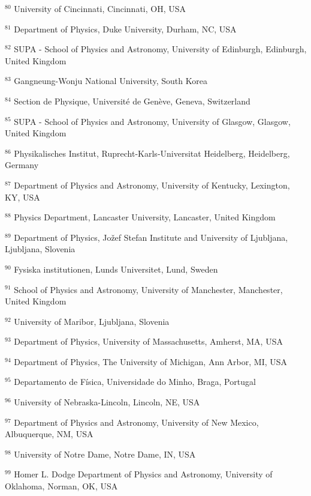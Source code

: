 \par {\footnotesize $^{80}$ University of Cincinnati, Cincinnati, OH, USA}
\par {\footnotesize $^{81}$ Department of Physics, Duke University, Durham, NC, USA}
\par {\footnotesize $^{82}$ SUPA - School of Physics and Astronomy, University of Edinburgh, Edinburgh, United Kingdom}
\par {\footnotesize $^{83}$ Gangneung-Wonju National University, South Korea}
\par {\footnotesize $^{84}$ Section de Physique, Université de Genève, Geneva, Switzerland}
\par {\footnotesize $^{85}$ SUPA - School of Physics and Astronomy, University of Glasgow, Glasgow, United Kingdom}
\par {\footnotesize $^{86}$ Physikalisches Institut, Ruprecht-Karls-Universitat Heidelberg, Heidelberg, Germany}
\par {\footnotesize $^{87}$ Department of Physics and Astronomy, University of Kentucky, Lexington, KY, USA}
\par {\footnotesize $^{88}$ Physics Department, Lancaster University, Lancaster, United Kingdom}
\par {\footnotesize $^{89}$ Department of Physics, Jožef Stefan Institute and University of Ljubljana, Ljubljana, Slovenia}
\par {\footnotesize $^{90}$ Fysiska institutionen, Lunds Universitet, Lund, Sweden}
\par {\footnotesize $^{91}$ School of Physics and Astronomy, University of Manchester, Manchester, United Kingdom}
\par {\footnotesize $^{92}$ University of Maribor, Ljubljana, Slovenia}
\par {\footnotesize $^{93}$ Department of Physics, University of Massachusetts, Amherst, MA, USA}
\par {\footnotesize $^{94}$ Department of Physics, The University of Michigan, Ann Arbor, MI, USA}
\par {\footnotesize $^{95}$ Departamento de Física, Universidade do Minho, Braga, Portugal}
\par {\footnotesize $^{96}$ University of Nebraska-Lincoln, Lincoln, NE, USA}
\par {\footnotesize $^{97}$ Department of Physics and Astronomy, University of New Mexico, Albuquerque, NM, USA}
\par {\footnotesize $^{98}$ University of Notre Dame, Notre Dame, IN, USA}
\par {\footnotesize $^{99}$ Homer L. Dodge Department of Physics and Astronomy, University of Oklahoma, Norman, OK, USA}
